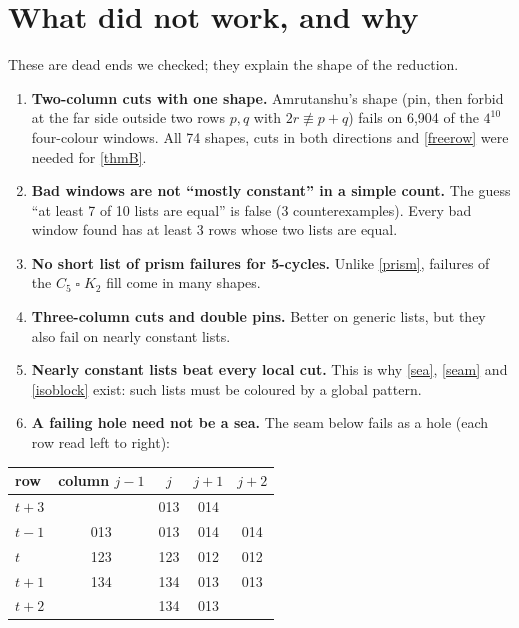 \documentclass[11pt,oneside,openany]{book}
\newcounter{res}[chapter]
\newcommand{\T}{\mathbin{\square}}
\begin{document}
\chapter{What did not work, and why}

These are dead ends we checked; they explain the shape of the reduction.

\begin{enumerate}[itemsep=0.4em]
\item \textbf{Two-column cuts with one shape.} Amrutanshu's shape (pin, then forbid at the far side outside two rows
$p, q$ with $2r \not\equiv p + q$) fails on 6{,}904 of the $4^{10}$ four-colour windows. All 74 shapes, cuts in both
directions and \ref{freerow} were needed for \ref{thmB}.
\item \textbf{Bad windows are not ``mostly constant'' in a simple count.} The guess ``at least 7 of 10 lists are equal''
is false (3 counterexamples). Every bad window found has at least 3 rows whose two lists are equal.
\item \textbf{No short list of prism failures for 5-cycles.} Unlike \ref{prism}, failures of the $C_5 \T K_2$ fill come in many
shapes.
\item \textbf{Three-column cuts and double pins.} Better on generic lists, but they also fail on nearly constant lists.
\item \textbf{Nearly constant lists beat every local cut.} This is why \ref{sea}, \ref{seam} and \ref{isoblock} exist: such
lists must be coloured by a global pattern.
\item \textbf{A failing hole need not be a sea.} The seam below fails as a hole (each row read left to right):
\end{enumerate}

\begin{center}
\renewcommand{\arraystretch}{1.15}
\begin{tabular}{lcccc}
\toprule
row & column $j-1$ & $j$ & $j+1$ & $j+2$\\
\midrule
$t+3$ & & 013 & 014 & \\
$t-1$ & 013 & 013 & 014 & 014\\
$t$ & 123 & 123 & 012 & 012\\
$t+1$ & 134 & 134 & 013 & 013\\
$t+2$ & & 134 & 013 & \\
\bottomrule
\end{tabular}
\end{center}
\end{document}
